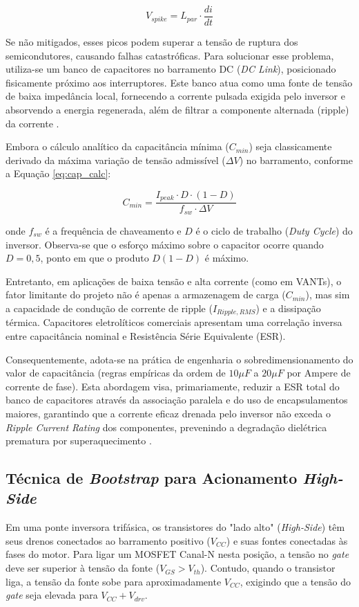 \documentclass[12pt, a4paper, openright, oneside, brazilian]{abntex2}
\begin{document}
\begin{equation}
    V_{spike} = L_{par} \cdot \frac{di}{dt}
\end{equation}

Se não mitigados, esses picos podem superar a tensão de ruptura dos semicondutores, causando falhas catastróficas. Para solucionar esse problema, utiliza-se um banco de capacitores no barramento DC (\textit{DC Link}), posicionado fisicamente próximo aos interruptores. Este banco atua como uma fonte de tensão de baixa impedância local, fornecendo a corrente pulsada exigida pelo inversor e absorvendo a energia regenerada, além de filtrar a componente alternada (ripple) da corrente \cite{rashid2014power}.

Embora o cálculo analítico da capacitância mínima ($C_{min}$) seja classicamente derivado da máxima variação de tensão admissível ($\Delta V$) no barramento, conforme a Equação \ref{eq:cap_calc}:

\begin{equation}
    C_{min} = \frac{I_{peak} \cdot D \cdot (1-D)}{f_{sw} \cdot \Delta V}
    \label{eq:cap_calc}
\end{equation}

\noindent onde $f_{sw}$ é a frequência de chaveamento e $D$ é o ciclo de trabalho (\textit{Duty Cycle}) do inversor. Observa-se que o esforço máximo sobre o capacitor ocorre quando $D=0,5$, ponto em que o produto $D(1-D)$ é máximo.

Entretanto, em aplicações de baixa tensão e alta corrente (como em VANTs), o fator limitante do projeto não é apenas a armazenagem de carga ($C_{min}$), mas sim a capacidade de condução de corrente de ripple ($I_{Ripple,RMS}$) e a dissipação térmica. Capacitores eletrolíticos comerciais apresentam uma correlação inversa entre capacitância nominal e Resistência Série Equivalente (ESR).

Consequentemente, adota-se na prática de engenharia o sobredimensionamento do valor de capacitância (regras empíricas da ordem de $10\mu F$ a $20\mu F$ por Ampere de corrente de fase). Esta abordagem visa, primariamente, reduzir a ESR total do banco de capacitores através da associação paralela e do uso de encapsulamentos maiores, garantindo que a corrente eficaz drenada pelo inversor não exceda o \textit{Ripple Current Rating} dos componentes, prevenindo a degradação dielétrica prematura por superaquecimento \cite{rashid2014power}.

\subsection{Técnica de \textit{Bootstrap} para Acionamento \textit{High-Side}}
Em uma ponte inversora trifásica, os transistores do "lado alto" (\textit{High-Side}) têm seus drenos conectados ao barramento positivo ($V_{CC}$) e suas fontes conectadas às fases do motor. Para ligar um MOSFET Canal-N nesta posição, a tensão no \textit{gate} deve ser superior à tensão da fonte ($V_{GS} > V_{th}$). Contudo, quando o transistor liga, a tensão da fonte sobe para aproximadamente $V_{CC}$, exigindo que a tensão do \textit{gate} seja elevada para $V_{CC} + V_{drv}$.
\end{document}
